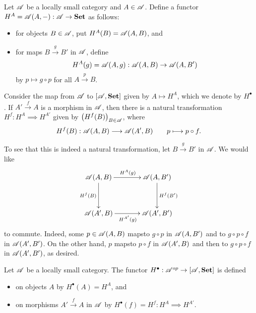 \begin{definition}
    Let $\mathscr A$ be a locally small category and $A\in\mathscr A$. Define a functor $H^A = \mathscr A(A, -): \mathscr A\to\mathbf{Set}$ as follows: 
    \begin{itemize}
        \item for objects $B\in\mathscr A$, put $H^A(B) = \mathscr A(A, B)$, and
        \item for maps $B\xrightarrow{g} B'$ in $\mathscr A$, define 
        \begin{equation*}
            H^A(g) = \mathscr A(A, g): \mathscr A(A, B)\to\mathscr A(A, B')
        \end{equation*}
        by $p\mapsto g\circ p$ for all $A\xrightarrow{p} B$.
    \end{itemize}
\end{definition}

Consider the map from $\mathscr A$ to $[\mathscr A, \mathbf{Set}]$ given by $A\mapsto H^A$, which we denote by $H^\bullet$. If $A'\xrightarrow{f} A$ is a morphism in $\mathscr A$, then there is a natural transformation $H^f: H^{A}\implies H^{A'}$ given by $\left(H^f(B)\right)_{B\in\mathscr A}$, where 
\begin{equation*}
    H^f(B): \mathscr A(A, B)\longrightarrow\mathscr A(A', B)\qquad p\longmapsto p\circ f.
\end{equation*}

To see that this is indeed a natural transformation, let $B\xrightarrow{g} B'$ in $\mathscr A$. We would like 
\begin{equation*}
    \xymatrix@+1pc {
        \scrA(A, B)\ar[r]^{H^A(g)}\ar[d]_{H^f(B)} & \scrA(A, B')\ar[d]^{H^f(B')}\\
        \scrA(A', B)\ar[r]_{H^{A'}(g)} & \scrA(A', B')
    }
\end{equation*}
to commute. Indeed, some $p\in\mathscr A(A, B)$ mapsto $g\circ p$ in $\mathscr A(A, B')$ and to $g\circ p\circ f$ in $\mathscr A(A', B')$. On the other hand, $p$ mapsto $p\circ f$ in $\mathscr A(A', B)$ and then to $g\circ  p\circ f$ in $\mathscr A(A', B')$, as desired.

\begin{definition}
    Let $\mathscr A$ be a locally small category. The functor $H^\bullet: \mathscr A^{op}\to[\mathscr A, \mathbf{Set}]$ is defined 
    \begin{itemize}
    \item on objects $A$ by $H^\bullet(A) = H^A$, and 
    \item on morphisms $A'\xrightarrow{f} A$ in $\mathscr A$ by $H^\bullet(f) = H^f: H^A\implies H^{A'}$.
    \end{itemize}
\end{definition}

